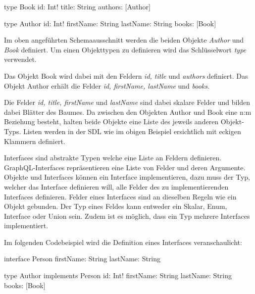 \begin{JsCode}
type Book {
    id: Int!
    title: String
    authors: [Author]
}
    
type Author {
    id: Int!
    firstName: String
    lastName: String
    books: [Book]
}
\end{JsCode}

Im oben angeführten Schemaausschnitt werden die beiden Objekte \textit{Author} und \textit{Book} definiert.
Um einen Objekttypen zu definieren wird das Schlüsselwort \textit{type} verwendet.

Das Objekt Book wird dabei mit den Feldern \textit{id, title} und \textit{authors} definiert.
Das Objekt Author erhält die Felder \textit{id, firstName, lastName} und \textit{books}.

Die Felder \textit{id, title, firstName} und \textit{lastName} sind dabei skalare Felder und bilden dabei Blätter des Baumes.
Da zwischen den Objekten Author und Book eine n:m Beziehung besteht, halten beide Objekte eine Liste des jeweils anderen Objekt-Typs.
Listen werden in der SDL wie im obigen Beispiel ersichtlich mit eckigen Klammern definiert.

Interfaces sind abstrakte Typen welche eine Liste an Feldern definieren.
GraphQL-Interfaces repräsentieren eine Liste von Felder und deren Argumente.
Objekte und Interfaces können ein Interface implementieren, dazu muss der Typ, welcher das Interface definieren will, alle Felder des zu implementierenden Interfaces definieren.
\newline
\cite[Abs. 3.7]{graphqlOnline}
Felder eines Interfaces sind an dieselben Regeln wie ein Objekt gebunden.
Der Typ eines Feldes kann entweder ein Skalar, Enum, Interface oder Union sein.
Zudem ist es möglich, dass ein Typ mehrere Interfaces implementiert.
\cite[S.65-66]{kress2020graphql}
\newline


Im folgenden Codebeispiel wird die Definition eines Interfaces veranschaulicht:

\begin{JsCode}
interface Person {
    firstName: String
    lastName: String
}

type Author implements Person {
    id: Int!
    firstName: String
    lastName: String
    books: [Book]
}
\end{JsCode}

